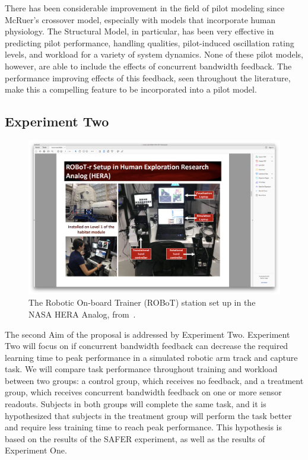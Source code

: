 There has been considerable improvement in the field of pilot modeling since McRuer's crossover model, especially with models that incorporate human physiology.
The Structural Model, in particular, has been very effective in predicting pilot performance, handling qualities, pilot-induced oscillation rating levels, and workload for a variety of system dynamics.
None of these pilot models, however, are able to include the effects of concurrent bandwidth feedback.
The performance improving effects of this feedback, seen throughout the literature, make this a compelling feature to be incorporated into a pilot model.

\subsection{Experiment Two}
\begin{figure}[tb]
    \begin{center}
        \includegraphics[trim={13cm 5cm 22cm 15.5cm},clip,width=\linewidth]{figures/Screen_Shot_2018-07-26_at_1_43_16_PM.png}
        \caption{The Robotic On-board Trainer (ROBoT) station set up in the NASA HERA Analog, from~\citep{robottalk}.}
        \label{figure:robotinhera}
    \end{center}
\end{figure}

The second Aim of the proposal is addressed by Experiment Two.
Experiment Two will focus on if concurrent bandwidth feedback can decrease the required learning time to peak performance in a simulated robotic arm track and capture task.
We will compare task performance throughout training and workload between two groups: a control group, which receives no feedback, and a treatment group, which receives concurrent bandwidth feedback on one or more sensor readouts.
Subjects in both groups will complete the same task, and it is hypothesized that subjects in the treatment group will perform the task better and require less training time to reach peak performance.
This hypothesis is based on the results of the SAFER experiment, as well as the results of Experiment One.

